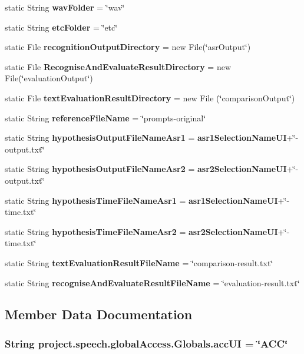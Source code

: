 \begin{DoxyCompactItemize}
static String {\bf wav\+Folder} = \char`\"{}wav\char`\"{}
\item 
static String {\bf etc\+Folder} = \char`\"{}etc\char`\"{}
\item 
static File {\bf recognition\+Output\+Directory} = new File(\char`\"{}asr\+Output\char`\"{})
\item 
static File {\bf Recognise\+And\+Evaluate\+Result\+Directory} = new File(\char`\"{}evaluation\+Output\char`\"{})
\item 
static File {\bf text\+Evaluation\+Result\+Directory} = new File (\char`\"{}comparison\+Output\char`\"{})
\item 
static String {\bf reference\+File\+Name} = \char`\"{}prompts-\/original\char`\"{}
\item 
static String {\bf hypothesis\+Output\+File\+Name\+Asr1} = {\bf asr1\+Selection\+Name\+U\+I}+\char`\"{}-\/output.\+txt\char`\"{}
\item 
static String {\bf hypothesis\+Output\+File\+Name\+Asr2} = {\bf asr2\+Selection\+Name\+U\+I}+\char`\"{}-\/output.\+txt\char`\"{}
\item 
static String {\bf hypothesis\+Time\+File\+Name\+Asr1} = {\bf asr1\+Selection\+Name\+U\+I}+\char`\"{}-\/time.\+txt\char`\"{}
\item 
static String {\bf hypothesis\+Time\+File\+Name\+Asr2} = {\bf asr2\+Selection\+Name\+U\+I}+\char`\"{}-\/time.\+txt\char`\"{}
\item 
static String {\bf text\+Evaluation\+Result\+File\+Name} = \char`\"{}comparison-\/result.\+txt\char`\"{}
\item 
static String {\bf recognise\+And\+Evaluate\+Result\+File\+Name} = \char`\"{}evaluation-\/result.\+txt\char`\"{}
\end{DoxyCompactItemize}


\subsection{Member Data Documentation}
\subsubsection[{acc\+U\+I}]{\setlength{\rightskip}{0pt plus 5cm}String project.\+speech.\+global\+Access.\+Globals.\+acc\+U\+I = \char`\"{}A\+C\+C\char`\"{}\hspace{0.3cm}{\ttfamily [static]}}\label{classproject_1_1speech_1_1global_access_1_1_globals_a6a59dd07c06bd1d79c6bf85cd1d942f9}
